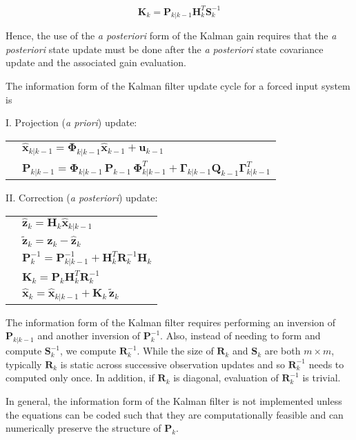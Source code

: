 \begin{equation*}
    \mathbf{K}_k = \mathbf{P}_{k|k-1} \mathbf{H}_k^T \mathbf{S}_k^{-1}
\end{equation*}

Hence, the use of the \textit{a posteriori} form of the Kalman gain requires that the
\textit{a posteriori} state update must be done after the \textit{a posteriori} state
covariance update and the associated gain evaluation.

The information form of the Kalman filter update cycle for a forced input system is

I. Projection (\textit{a priori}) update:

\begingroup
\renewcommand{\arraystretch}{1.25}
\begin{tabular}{l l}
\phantom{.} & $\hat{\mathbf{x}}_{k|k-1} = \mathbf{\Phi}_{k|k-1} \hat{\mathbf{x}}_{k-1} + \mathbf{u}_{k-1}$ \\
\phantom{.} & $\mathbf{P}_{k|k-1} = \mathbf{\Phi}_{k|k-1} \, \mathbf{P}_{k-1} \, \mathbf{\Phi}_{k|k-1}^T + \mathbf{\Gamma}_{k|k-1} \mathbf{Q}_{k-1} \mathbf{\Gamma}_{k|k-1}^T$
\end{tabular}
\endgroup

II. Correction (\textit{a posteriori}) update:

\begingroup
\renewcommand{\arraystretch}{1.25}
\begin{tabular}{l l}
\phantom{.} & $\hat{\mathbf{z}}_k = \mathbf{H}_k \hat{\mathbf{x}}_{k|k-1}$ \\
\phantom{.} & $\tilde{\mathbf{z}}_k = \mathbf{z}_k - \hat{\mathbf{z}}_k$ \\
\phantom{.} & $\mathbf{P}_k^{-1} = \mathbf{P}_{k|k-1}^{-1} + \mathbf{H}_k^T \mathbf{R}_k^{-1} \mathbf{H}_k$ \\
\phantom{.} & $\mathbf{K}_{k} = \mathbf{P}_k \mathbf{H}_k^T \mathbf{R}_k^{-1}$ \\
\phantom{.} & $\hat{\mathbf{x}}_k = \hat{\mathbf{x}}_{k|k-1} +\mathbf{K}_k \, \tilde{\mathbf{z}}_k$
\end{tabular}
\endgroup

The information form of the Kalman filter requires performing an inversion of
$\mathbf{P}_{k|k-1}$ and another inversion of $\mathbf{P}_k^{-1}$. Also, instead of
needing to form and compute $\mathbf{S}_k^{-1}$, we compute $\mathbf{R}_k^{-1}$.
While the size of $\mathbf{R}_k$ and $\mathbf{S}_k$ are both $m \times m$, typically
$\mathbf{R}_k$ is static across successive observation updates and so $\mathbf{R}_k^{-1}$
needs to computed only once. In addition, if $\mathbf{R}_k$ is diagonal, evaluation of
$\mathbf{R}_k^{-1}$ is trivial.

In general, the information form of the Kalman filter is not implemented unless the
equations can be coded such that they are computationally feasible and can numerically
preserve the structure of $\mathbf{P}_k$.

